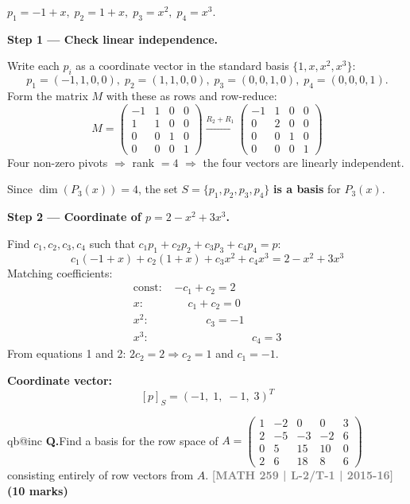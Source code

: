 \documentclass[12pt,a3paper]{article}
\makeatletter
\newcommand{\yr}[1]{\hfill\textcolor{gray}{\small\textbf{[#1]}}}
\newcommand{\mk}[1]{\textcolor{orange!70!black}{\small\textbf{(#1 marks)}}}
\newcounter{qnum}
\newcommand{\Q}[1]{%
  \csname qb@inc\endcsname
  \needspace{4\baselineskip}
  \refstepcounter{qnum}
  \vspace{6pt}
  \noindent\textbf{Q\theqnum.}\enspace #1\par
}
\makeatother
\begin{document}
\begin{tcolorbox}[enhanced,breakable,colback=cC!4,colframe=cC,
  boxrule=0.8pt,arc=5pt,
  title={\textbf{Answer}},
  fonttitle=\bfseries\color{white},colbacktitle=cC]

$p_1=-1+x,\;p_2=1+x,\;p_3=x^2,\;p_4=x^3$.

\textbf{Step 1 --- Check linear independence.}

Write each $p_i$ as a coordinate vector in the standard basis $\{1,x,x^2,x^3\}$:
\[
p_1=(-1,1,0,0),\;p_2=(1,1,0,0),\;p_3=(0,0,1,0),\;p_4=(0,0,0,1).
\]
Form the matrix $M$ with these as rows and row-reduce:
\[
M=\begin{pmatrix}-1&1&0&0\\1&1&0&0\\0&0&1&0\\0&0&0&1\end{pmatrix}
\xrightarrow{R_2+R_1}
\begin{pmatrix}-1&1&0&0\\0&2&0&0\\0&0&1&0\\0&0&0&1\end{pmatrix}
\]
Four non-zero pivots $\Rightarrow$ rank $=4$ $\Rightarrow$ the four vectors are linearly independent.

Since $\dim(P_3(x))=4$, the set $S=\{p_1,p_2,p_3,p_4\}$ \textbf{is a basis} for $P_3(x)$.

\medskip
\textbf{Step 2 --- Coordinate of $p=2-x^2+3x^3$.}

Find $c_1,c_2,c_3,c_4$ such that $c_1p_1+c_2p_2+c_3p_3+c_4p_4=p$:
\[
c_1(-1+x)+c_2(1+x)+c_3x^2+c_4x^3 = 2-x^2+3x^3
\]
Matching coefficients:
\begin{align*}
  \text{const: } &-c_1+c_2 = 2\\
  x: &\phantom{-}c_1+c_2 = 0\\
  x^2: &\phantom{-c_1+}c_3 = -1\\
  x^3: &\phantom{-c_1+c_2+c_3+}c_4 = 3
\end{align*}
From equations 1 and 2: $2c_2=2\Rightarrow c_2=1$ and $c_1=-1$.

\textbf{Coordinate vector:}
\[
  [p]_S = (-1,\;1,\;-1,\;3)^T
\]
\end{tcolorbox}

\Q{Find a basis for the row space of 
$A = \begin{pmatrix} 1 & -2 & 0 & 0 & 3 \\ 2 & -5 & -3 & -2 & 6 \\ 0 & 5 & 15 & 10 & 0 \\ 2 & 6 & 18 & 8 & 6 \end{pmatrix}$ 
consisting entirely of row vectors from $A$.
\yr{MATH 259 | L-2/T-1 | 2015-16} \mk{10}}
\end{document}
